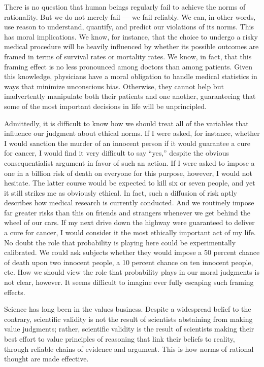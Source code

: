 \documentclass[a4paper,14pt]{extarticle}
\begin{document}
There is no question that human beings regularly fail to achieve the norms of rationality.
But we do not merely fail --- we fail reliably.
We can, in other words, use reason to understand, quantify, and predict our violations of its norms.
This has moral implications.
We know, for instance, that the choice to undergo a risky medical procedure will be heavily influenced by whether its possible outcomes are framed in terms of survival rates or mortality rates.
We know, in fact, that this framing effect is no less pronounced among doctors than among patients.
Given this knowledge, physicians have a moral obligation to handle medical statistics in ways that minimize unconscious bias.
Otherwise, they cannot help but inadvertently manipulate both their patients and one another, guaranteeing that some of the most important decisions in life will be unprincipled.

Admittedly, it is difficult to know how we should treat all of the variables that influence our judgment about ethical norms.
If I were asked, for instance, whether I would sanction the murder of an innocent person if it would guarantee a cure for cancer, I would find it very difficult to say ``yes,'' despite the obvious consequentialist argument in favor of such an action.
If I were asked to impose a one in a billion risk of death on everyone for this purpose, however, I would not hesitate.
The latter course would be expected to kill six or seven people, and yet it still strikes me as obviously ethical.
In fact, such a diffusion of risk aptly describes how medical research is currently conducted.
And we routinely impose far greater risks than this on friends and strangers whenever we get behind the wheel of our cars.
If my next drive down the highway were guaranteed to deliver a cure for cancer, I would consider it the most ethically important act of my life.
No doubt the role that probability is playing here could be experimentally calibrated.
We could ask subjects whether they would impose a 50 percent chance of death upon two innocent people, a 10 percent chance on ten innocent people, etc.
How we should view the role that probability plays in our moral judgments is not clear, however.
It seems difficult to imagine ever fully escaping such framing effects.

Science has long been in the values business.
Despite a widespread belief to the contrary, scientific validity is not the result of scientists abstaining from making value judgments;
rather, scientific validity is the result of scientists making their best effort to value principles of reasoning that link their beliefs to reality, through reliable chains of evidence and argument.
This is how norms of rational thought are made effective.
\end{document}
